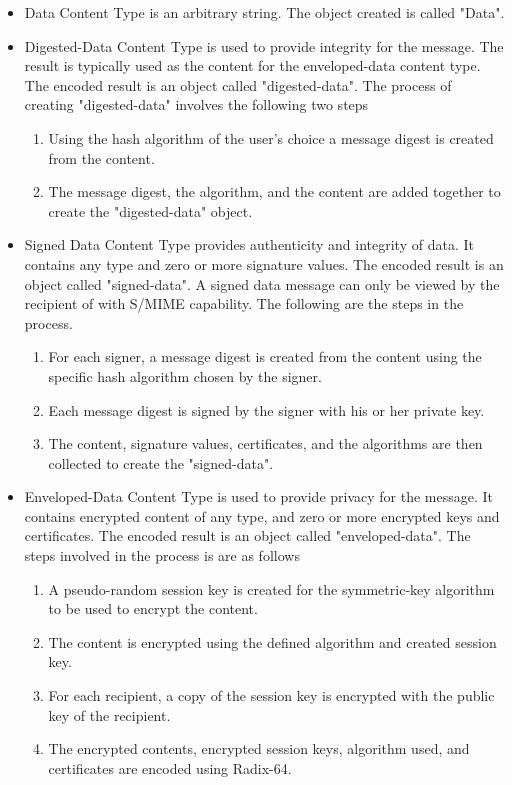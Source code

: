\begin{itemize}
\item Data Content Type is an arbitrary string.  The object created is called "Data".
\item Digested-Data Content Type is used to provide integrity for the message. The result is typically used as the content for the enveloped-data content type.  The encoded result is an object called "digested-data".  The process of creating "digested-data" involves the following two steps
\begin{enumerate}
\item Using the hash algorithm of the user's choice a message digest is created from the content.
\item The message digest, the algorithm, and the content are added together to create the "digested-data" object.
\end{enumerate}
\item Signed Data Content Type provides authenticity and integrity of data. It contains any type and zero or more signature values. The encoded result is an object called "signed-data". A signed data message can only be viewed by the recipient of with S/MIME capability. The following are the steps in the process.
\begin{enumerate}
\item For each signer, a message digest is created from the content using the specific hash algorithm chosen by the signer.
\item Each message digest is signed by the signer with his or her private key.
\item The content, signature values, certificates, and the algorithms are then collected to create the "signed-data".
\end{enumerate}
\item Enveloped-Data Content Type is used to provide privacy for the message. It contains encrypted content of any type, and zero or more encrypted keys and certificates. The encoded result is an object called "enveloped-data". The steps involved in the process is are as follows
\begin{enumerate}
\item A pseudo-random session key is created for the symmetric-key algorithm to be used to encrypt the content.
\item The content is encrypted using the defined algorithm and created session key.
\item For each recipient, a copy of the session key is encrypted with the public key of the recipient.
\item The encrypted contents, encrypted session keys, algorithm used, and certificates are encoded using Radix-64.
\end{enumerate}
\end{itemize}
